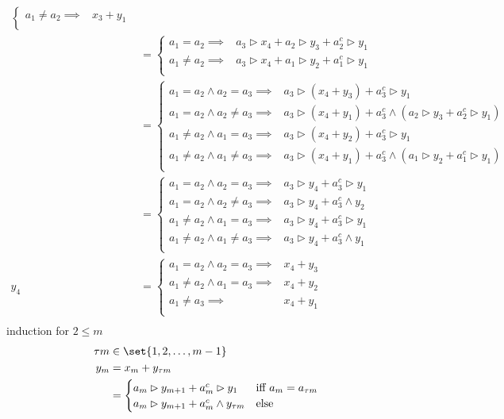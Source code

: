 \begin{equation}
\begin{split}
\begin{cases}
			a_1\not=a_2 \implies & x_3+y_1 \\
			\end{cases} \\
		&= \begin{cases}
			a_1=a_2 \implies & a_3\rhd x_4 + a_2\rhd y_3 + a_2^c\rhd y_1 \\
			a_1\not=a_2 \implies & a_3\rhd x_4 + a_1\rhd y_2 + a_1^c\rhd y_1 \\
			\end{cases} \\
		&= \begin{cases}
			a_1=a_2\wedge a_2=a_3 \implies & a_3\rhd (x_4 + y_3) + a_3^c\rhd y_1 \\
			a_1=a_2\wedge a_2\not=a_3 \implies & a_3\rhd (x_4 + y_1) + a_3^c\wedge(a_2\rhd y_3 + a_2^c\rhd y_1) \\
			a_1\not=a_2\wedge a_1=a_3 \implies & a_3\rhd (x_4 + y_2) + a_3^c\rhd y_1 \\
			a_1\not=a_2\wedge a_1\not=a_3 \implies & a_3\rhd (x_4 + y_1) + a_3^c\wedge(a_1\rhd y_2 + a_1^c\rhd y_1) \\
			\end{cases} \\
		&= \begin{cases}
			a_1=a_2\wedge a_2=a_3 \implies & a_3\rhd y_4 + a_3^c\rhd y_1 \\
			a_1=a_2\wedge a_2\not=a_3 \implies & a_3\rhd y_4 + a_3^c\wedge y_2 \\
			a_1\not=a_2\wedge a_1=a_3 \implies & a_3\rhd y_4 + a_3^c\rhd y_1 \\
			a_1\not=a_2\wedge a_1\not=a_3 \implies & a_3\rhd y_4 + a_3^c\wedge y_1 \\
			\end{cases} \\
	y_4 &= \begin{cases}
			a_1=a_2\wedge a_2=a_3 \implies & x_4+y_3 \\
			a_1\not=a_2\wedge a_1=a_3 \implies & x_4+y_2 \\
			a_1\not=a_3 \implies & x_4+y_1 \\
			\end{cases} \\
\end{split}\end{equation}
induction for $2\le m$
\begin{equation}\begin{split}
	\tau m &\in \set{1,2,\dots,m-1} \\
	y_m &= x_m + y_{\tau m} \\
		&= \begin{cases}
			a_m\rhd y_{m+1} + a_m^c\rhd y_1 & \text{iff }a_m=a_{\tau m} \\
			a_m\rhd y_{m+1} + a_m^c\wedge y_{\tau m} & \text{else} \\
			\end{cases} \\
\end{split}\end{equation}
